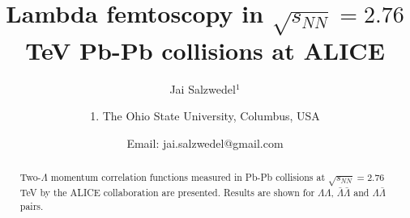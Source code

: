 \documentclass[ALICE,manyauthors]{ALICE_internal_notes}
\begin{document}
%
%
%
\begin{titlepage}
%
%
%
\title{Lambda femtoscopy in $\sqrt{s_{NN}}=2.76$ TeV Pb-Pb collisions at ALICE}
%
\author{Jai Salzwedel$^{1}$}
\author{
1. The Ohio State University, Columbus, USA\\
}
\author{Email: jai.salzwedel@gmail.com}
%
%
\begin{abstract}
Two-$\Lambda$ momentum correlation functions measured in Pb-Pb collisions at $\sqrt{s_{NN}}=2.76$ TeV by the ALICE collaboration are presented.  Results are shown for $\Lambda\Lambda$, $\bar{\Lambda}\bar{\Lambda}$ and $\Lambda\bar{\Lambda}$ pairs.
\end{abstract}
\end{titlepage}
%

\end{document}
